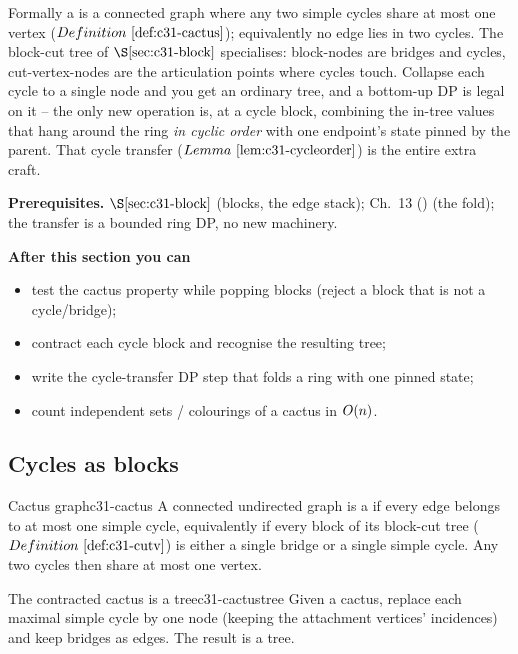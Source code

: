 \begin{topicintro}
Formally a  is a connected graph where any two simple cycles share at
most one vertex (\(\defref{c31-cactus}\)); equivalently no edge lies in two cycles.
The block-cut tree of \(\secref{c31-block}\) specialises: block-nodes are bridges and
cycles, cut-vertex-nodes are the articulation points where cycles touch.  Collapse
each cycle to a single node and you get an ordinary tree, and a bottom-up DP is legal
on it -- the only new operation is, at a cycle block, combining the in-tree values
that hang around the ring \emph{in cyclic order} with one endpoint's state pinned by
the parent.  That cycle transfer (\(\lemref{c31-cycleorder}\)) is the entire extra
craft.

\textbf{Prerequisites.} \(\secref{c31-block}\) (blocks, the edge stack); Ch.~13
() (the fold); the transfer is a bounded ring DP, no new machinery.

\textbf{After this section you can}
\begin{itemize}[nosep]
  \item test the cactus property while popping blocks (reject a block that is not a cycle/bridge); \hfill{}
  \item contract each cycle block and recognise the resulting tree; \hfill{}
  \item write the cycle-transfer DP step that folds a ring with one pinned state; \hfill{}
  \item count independent sets / colourings of a cactus in \(O(n)\). \hfill{}
\end{itemize}
\end{topicintro}

\subsection{Cycles as blocks}

\begin{definition}{Cactus graph}{c31-cactus}
A connected undirected graph is a  if every edge belongs to at most one
simple cycle, equivalently if every block of its block-cut tree
(\(\defref{c31-cutv}\)) is either a single bridge or a single simple cycle.  Any two
cycles then share at most one vertex.
\end{definition}

\begin{theorem}{The contracted cactus is a tree}{c31-cactustree}
Given a cactus, replace each maximal simple cycle by one node (keeping the
attachment vertices' incidences) and keep bridges as edges.  The result is a tree.
\end{theorem}

